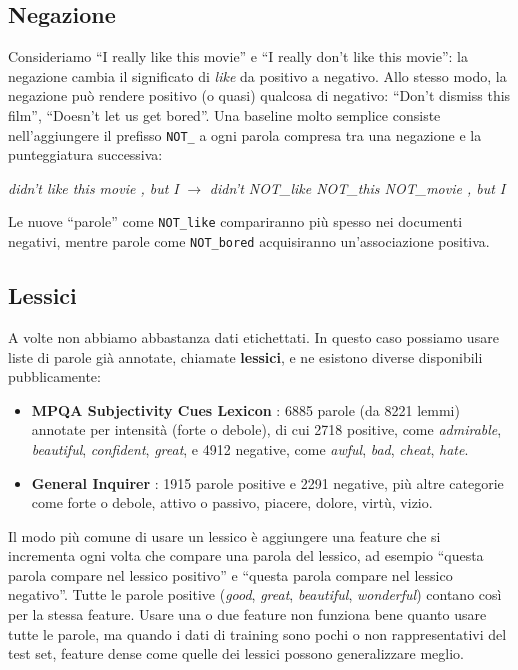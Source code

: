 \subsection{Negazione}
Consideriamo \enquote{I really like this movie} e \enquote{I really don't like this movie}: la negazione cambia il significato di \textit{like} da positivo a negativo. Allo stesso modo, la negazione può rendere positivo (o quasi) qualcosa di negativo: \enquote{Don't dismiss this film}, \enquote{Doesn't let us get bored}. Una baseline molto semplice \cite{pang2002} consiste nell'aggiungere il prefisso \texttt{NOT\_} a ogni parola compresa tra una negazione e la punteggiatura successiva:
\begin{center}
\textit{didn't like this movie , but I} \quad $\longrightarrow$ \quad \textit{didn't NOT\_like NOT\_this NOT\_movie , but I}
\end{center}
Le nuove \enquote{parole} come \texttt{NOT\_like} compariranno più spesso nei documenti negativi, mentre parole come \texttt{NOT\_bored} acquisiranno un'associazione positiva.

\subsection{Lessici}
A volte non abbiamo abbastanza dati etichettati. In questo caso possiamo usare liste di parole già annotate, chiamate \textbf{lessici}, e ne esistono diverse disponibili pubblicamente:
\begin{itemize}
    \item \textbf{MPQA Subjectivity Cues Lexicon} \cite{wilson2005}: 6885 parole (da 8221 lemmi) annotate per intensità (forte o debole), di cui 2718 positive, come \textit{admirable}, \textit{beautiful}, \textit{confident}, \textit{great}, e 4912 negative, come \textit{awful}, \textit{bad}, \textit{cheat}, \textit{hate}.
    \item \textbf{General Inquirer} \cite{stone1966}: 1915 parole positive e 2291 negative, più altre categorie come forte o debole, attivo o passivo, piacere, dolore, virtù, vizio.
\end{itemize}
Il modo più comune di usare un lessico è aggiungere una feature che si incrementa ogni volta che compare una parola del lessico, ad esempio \enquote{questa parola compare nel lessico positivo} e \enquote{questa parola compare nel lessico negativo}. Tutte le parole positive (\textit{good}, \textit{great}, \textit{beautiful}, \textit{wonderful}) contano così per la stessa feature. Usare una o due feature non funziona bene quanto usare tutte le parole, ma quando i dati di training sono pochi o non rappresentativi del test set, feature dense come quelle dei lessici possono generalizzare meglio.

